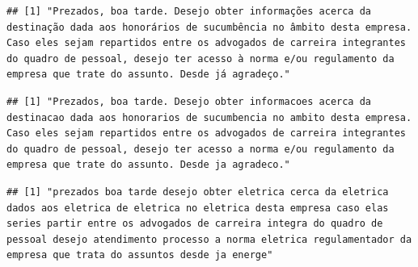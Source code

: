 \documentclass[]{article}
\newenvironment{Shaded}{\begin{snugshade}}{\end{snugshade}}
\newcommand{\KeywordTok}[1]{\textcolor[rgb]{0.13,0.29,0.53}{\textbf{#1}}}
\newcommand{\DecValTok}[1]{\textcolor[rgb]{0.00,0.00,0.81}{#1}}
\newcommand{\OperatorTok}[1]{\textcolor[rgb]{0.81,0.36,0.00}{\textbf{#1}}}
\newcommand{\NormalTok}[1]{#1}
\begin{document}
\begin{Shaded}
\end{Shaded}

\begin{verbatim}
## [1] "Prezados, boa tarde. Desejo obter informações acerca da destinação dada aos honorários de sucumbência no âmbito desta empresa. Caso eles sejam repartidos entre os advogados de carreira integrantes do quadro de pessoal, desejo ter acesso à norma e/ou regulamento da empresa que trate do assunto. Desde já agradeço."
\end{verbatim}

\begin{Shaded}
\end{Shaded}

\begin{verbatim}
## [1] "Prezados, boa tarde. Desejo obter informacoes acerca da destinacao dada aos honorarios de sucumbencia no ambito desta empresa. Caso eles sejam repartidos entre os advogados de carreira integrantes do quadro de pessoal, desejo ter acesso a norma e/ou regulamento da empresa que trate do assunto. Desde ja agradeco."
\end{verbatim}

\begin{Shaded}
\end{Shaded}

\begin{verbatim}
## [1] "prezados boa tarde desejo obter eletrica cerca da eletrica dados aos eletrica de eletrica no eletrica desta empresa caso elas series partir entre os advogados de carreira integra do quadro de pessoal desejo atendimento processo a norma eletrica regulamentador da empresa que trata do assuntos desde ja energe"
\end{verbatim}

\begin{Shaded}
\end{Shaded}
\end{document}

